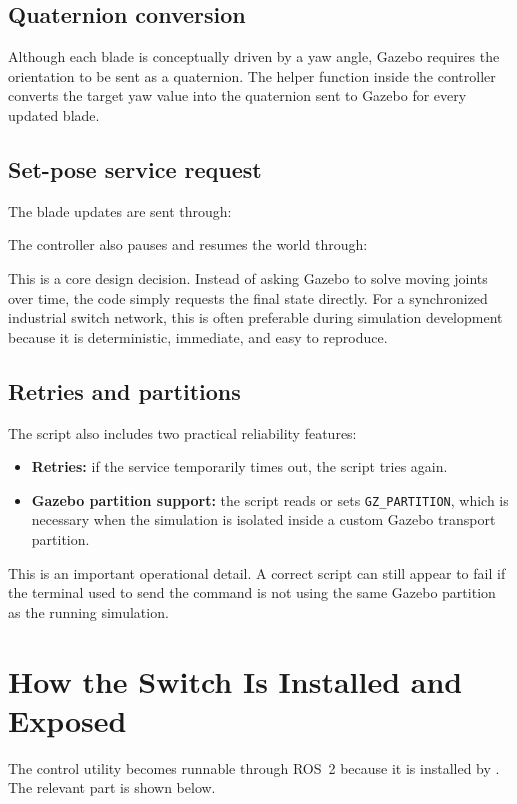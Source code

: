\documentclass[11pt,a4paper]{article}
\begin{document}
\subsection{Quaternion conversion}
Although each blade is conceptually driven by a yaw angle, Gazebo requires the orientation to be sent as a quaternion. The helper function inside the controller converts the target yaw value into the quaternion sent to Gazebo for every updated blade.

\subsection{Set-pose service request}
The blade updates are sent through:
\begin{center}
\end{center}

The controller also pauses and resumes the world through:
\begin{center}
\end{center}

This is a core design decision. Instead of asking Gazebo to solve moving joints over time, the code simply requests the final state directly. For a synchronized industrial switch network, this is often preferable during simulation development because it is deterministic, immediate, and easy to reproduce.

\subsection{Retries and partitions}
The script also includes two practical reliability features:
\begin{itemize}
\item \textbf{Retries:} if the service temporarily times out, the script tries again.
\item \textbf{Gazebo partition support:} the script reads or sets \texttt{GZ\_PARTITION}, which is necessary when the simulation is isolated inside a custom Gazebo transport partition.
\end{itemize}

This is an important operational detail. A correct script can still appear to fail if the terminal used to send the command is not using the same Gazebo partition as the running simulation.

\section{How the Switch Is Installed and Exposed}
The control utility becomes runnable through ROS~2 because it is installed by . The relevant part is shown below.
\end{document}
